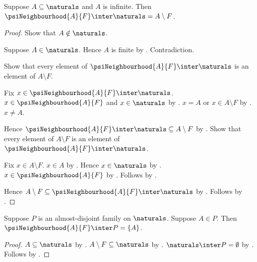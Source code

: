 \begin{proposition}\label{psi_neighbourhood_natural_trace}
    Suppose $A\subseteq\naturals$ and $A$ is infinite.
    Then $\psiNeighbourhood{A}{F}\inter\naturals=A\setminus F$.
\end{proposition}
\begin{proof}
    Show that $A\notin\naturals$.
    \begin{subproof}
        Suppose $A\in\naturals$.
        Hence $A$ is finite by .
        Contradiction.
    \end{subproof}
    Show that every element of
        $\psiNeighbourhood{A}{F}\inter\naturals$
        is an element of $A\setminus F$.
    \begin{subproof}
        Fix $x\in\psiNeighbourhood{A}{F}\inter\naturals$.
        $x\in\psiNeighbourhood{A}{F}$ and $x\in\naturals$
            by .
        $x=A$ or $x\in A\setminus F$
            by .
        $x\neq A$.
    \end{subproof}
    Hence $\psiNeighbourhood{A}{F}\inter\naturals
        \subseteq A\setminus F$ by .
    Show that every element of $A\setminus F$ is an element of
        $\psiNeighbourhood{A}{F}\inter\naturals$.
    \begin{subproof}
        Fix $x\in A\setminus F$.
        $x\in A$ by .
        Hence $x\in\naturals$ by .
        $x\in\psiNeighbourhood{A}{F}$
            by .
        Follows by .
    \end{subproof}
    Hence $A\setminus F\subseteq
        \psiNeighbourhood{A}{F}\inter\naturals$ by .
    Follows by .
\end{proof}

\begin{proposition}\label{psi_neighbourhood_family_trace}
    Suppose $P$ is an almost-disjoint family on
        $\naturals$.
    Suppose $A\in P$.
    Then $\psiNeighbourhood{A}{F}\inter P=\{A\}$.
\end{proposition}
\begin{proof}
    $A\subseteq\naturals$
        by .
    $A\setminus F\subseteq\naturals$
        by .
    $\naturals\inter P=\emptyset$
        by .
    Follows by
        .
\end{proof}

